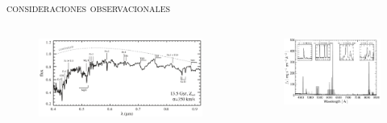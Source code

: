 \documentclass[xcolor=dvipsnames,4pt,hyperref={colorlinks,citecolor=black,linkcolor=black,urlcolor=black}]{beamer}
\begin{document}
\begin{frame}{\textsc{consideraciones observacionales}}

\begin{columns}



\begin{figure}
\includegraphics[scale=0.32]{img/conroy2014-1}
\end{figure}
\begin{figure}
\includegraphics[scale=0.64]{img/hayes2016-2}
\end{figure}


\end{columns}
\end{frame}
\end{document}
